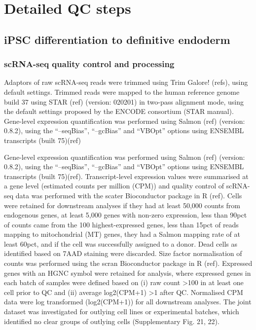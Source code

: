 \chapter{Detailed QC steps} 

\section*{iPSC differentiation to definitive endoderm}

\subsection*{scRNA-seq quality control and processing}

Adaptors of raw scRNA-seq reads were trimmed using Trim Galore! (refs), using default settings. Trimmed reads were mapped to the human reference genome build 37 using STAR (ref) (version: 020201) in two-pass alignment mode, using the default settings proposed by the ENCODE consortium (STAR manual). Gene-level expression quantification was performed using Salmon (ref) (version: 0.8.2), using the “--seqBias”, “--gcBias” and “VBOpt” options using ENSEMBL transcripts (built 75)(ref)

Gene-level expression quantification was performed using Salmon (ref) (version: 0.8.2), using the “--seqBias”, “--gcBias” and “VBOpt” options using ENSEMBL transcripts (built 75)(ref). Transcript-level expression values were summarised at a gene level (estimated counts per million (CPM)) and quality control of scRNA-seq data was performed with the scater Bioconductor package in R (ref). Cells were retained for downstream analyses if they had at least 50,000 counts from endogenous genes, at least 5,000 genes with non-zero expression, less than 90pct of counts came from the 100 highest-expressed genes, less than 15pct of reads mapping to mitochondrial (MT) genes, they had a Salmon mapping rate of at least 60pct, and if the cell was successfully assigned to a donor. Dead cells as identified based on 7AAD staining were discarded. Size factor normalisation of counts was performed using the scran Bioconductor package in R (ref). Expressed genes with an HGNC symbol were retained for analysis, where expressed genes in each batch of samples were defined based on (i) raw count >100 in at least one cell prior to QC and (ii) average log2(CPM+1) >1 after QC. Normalised CPM data were log transformed (log2(CPM+1)) for all downstream analyses. The joint dataset was investigated for outlying cell lines or experimental batches, which identified no clear groups of outlying cells (Supplementary Fig. 21, 22). 


